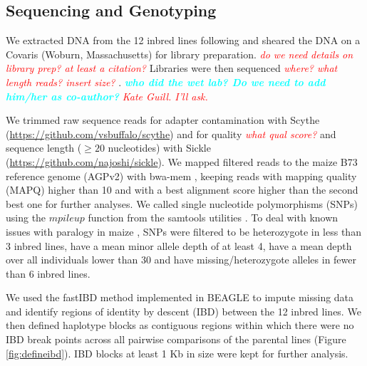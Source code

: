 \documentclass[9pt,twocolumn,twoside]{gsajnl}
\newcommand{\yang}[1]{\textcolor{cyan}{\emph{\bf  #1}} }
\newcommand{\jri}[1]{\textcolor{red}{ \emph{ #1}} }
\begin{document}
\subsection*{Sequencing and Genotyping}

We extracted DNA from the 12 inbred lines following \citet{Doyle1987} and sheared the DNA on a Covaris (Woburn, Massachusetts) for library preparation. \jri{do we need details on library prep? at least a citation?}
Libraries were then sequenced \jri{where? what length reads? insert size?}. \yang{who did the wet lab? Do we need to add him/her as co-author?} \jri{Kate Guill. I'll ask.}

We trimmed raw sequence reads for adapter contamination with Scythe  (\url{https://github.com/vsbuffalo/scythe}) and for quality \jri{what qual score?} and sequence length ($\geq 20$ nucleotides) with Sickle (\url{https://github.com/najoshi/sickle}). 
We mapped filtered reads to the maize B73 reference genome (AGPv2) with bwa-mem \citep{Li2009B}, keeping reads with mapping quality (MAPQ) higher than 10 and with a best alignment score higher than the second best one for further analyses.
We called single nucleotide polymorphisms (SNPs) using the $mpileup$ function from the samtools utilities \citep{Li2009}. 
To deal with known issues with paralogy in maize \citep{Chia2012}, SNPs were filtered to be heterozygote in less than 3 inbred lines, have a mean minor allele depth of at least 4, have a mean depth over all individuals lower than 30 and have missing/heterozygote alleles in fewer than 6 inbred lines. 

We used the fastIBD method implemented in BEAGLE \citep{Browning2009} to impute missing data and identify regions of identity by descent (IBD) between the 12 inbred lines. 
We then defined haplotype blocks as contiguous regions within which there were no IBD break points across all pairwise comparisons of the parental lines (Figure \ref{fig:defineibd}). IBD blocks at least 1 Kb in size were kept for further analysis. 


\end{document}
